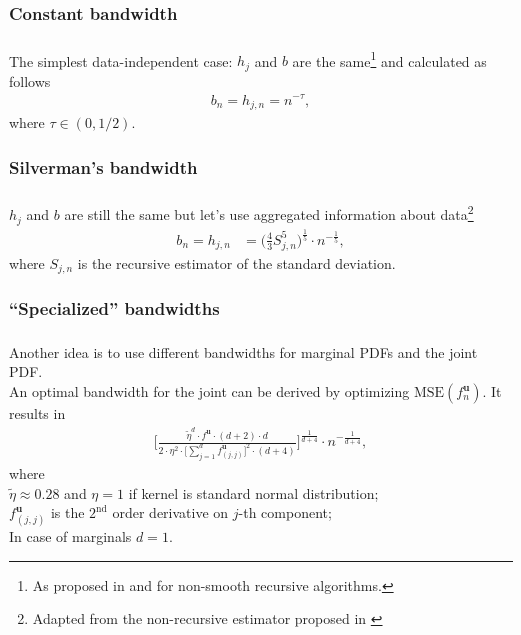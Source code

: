 \documentclass[aspectratio=169]{beamer}
\begin{document}
		\subsubsection{Constant bandwidth}
			\begin{frame}
				\frametitle{\insertsubsubsection}
				
				The simplest data-independent case: $ h_j $ and $ b $ are the same\footnote{As proposed in \textcite{Robinson1975} and \textcite{Holst1987} for non-smooth recursive algorithms.} and calculated as follows
				\begin{align}
					b_n = h_{j,n} = n^{-\tau},
				\end{align}
				where $ \tau \in (0, 1/2) $.
				
			\end{frame}	
			
		\subsubsection{Silverman's bandwidth}
			\begin{frame}
				\frametitle{\insertsubsubsection}
				
				$ h_j $ and $ b $ are still the same but let's use aggregated information about data\footnote{Adapted from the non-recursive estimator proposed in \textcite{Silverman1986}}
				\begin{align}
					b_n = h_{j, n} &= \bigg(\frac{4}{3}S_{j, n}^5\bigg)^{\frac{1}{5}} \cdot n^{-\frac{1}{5}},
				\end{align}
				where $ S_{j,n} $ is the recursive estimator of the standard deviation.
				
			\end{frame}
			
		\subsubsection{``Specialized'' bandwidths}
			\begin{frame}
				\frametitle{\insertsubsubsection}
				
				Another idea is to use different bandwidths for marginal PDFs and the joint PDF.\\[1em]
				
				\onslide<2-> An optimal bandwidth for the joint can be derived by optimizing $ \text{MSE}(f^{\mathbf{u}}_n) $. It results in
				\begin{align}
					\Bigg[\frac{\widetilde{\eta}^d\cdot f^{\mathbf{u}}\cdot(d+2)\cdot d}{2\cdot\eta^2\cdot\big[\sum_{j=1}^{d}f^{\mathbf{u}}_{(j, j)}\big]^2\cdot(d+4)}\Bigg]^{\frac{1}{d+4}} \cdot n^{-\frac{1}{d+4}},
				\end{align}
				where \\[1ex]
				$ \widetilde{\eta} \approx 0.28 $ and $ \eta = 1 $ if kernel is standard normal distribution;\\[0.5ex]
				$ f^\mathbf{u}_{(j,j)} $ is the $ 2^{\text{nd}} $ order derivative on $ j $-th component;\\[0.5ex]
				In case of marginals $ d=1 $.
				
			\end{frame}
	
\end{document}
